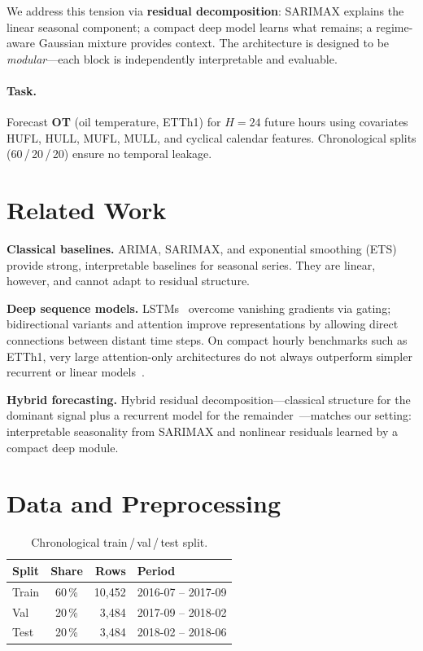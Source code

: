 \documentclass[10pt,a4paper,twocolumn]{article}
\begin{document}
We address this tension via \textbf{residual decomposition}: SARIMAX explains
the linear seasonal component; a compact deep model learns what remains; a
regime-aware Gaussian mixture provides context.
The architecture is designed to be \emph{modular}---each block is independently
interpretable and evaluable.

\paragraph{Task.}
Forecast \textbf{OT} (oil temperature, ETTh1) for $H=24$ future hours using
covariates HUFL, HULL, MUFL, MULL, and cyclical calendar features.
Chronological splits (60\,/\,20\,/\,20) ensure no temporal leakage.

\section{Related Work}

\textbf{Classical baselines.}
ARIMA, SARIMAX, and exponential smoothing (ETS) provide strong, interpretable
baselines for seasonal series.
They are linear, however, and cannot adapt to residual structure.

\textbf{Deep sequence models.}
LSTMs~\citep{hochreiter1997lstm} overcome vanishing gradients via gating;
bidirectional variants and attention improve representations by allowing direct
connections between distant time steps.
On compact hourly benchmarks such as ETTh1, very large attention-only
architectures do not always outperform simpler recurrent or linear
models~\citep{zeng2023ltsproblem}.

\textbf{Hybrid forecasting.}
Hybrid residual decomposition---classical structure for the dominant signal plus
a recurrent model for the remainder~\citep{smyl2020hybrid}---matches our setting:
interpretable seasonality from SARIMAX and nonlinear residuals learned by a
compact deep module.

\section{Data and Preprocessing}

\begin{table}[h]
  \centering
  \caption{Chronological train\,/\,val\,/\,test split.}
  \label{tab:splits}
  \small
  \begin{tabular}{@{} l c r l @{}}
    \toprule
    Split & Share & Rows & Period \\
    \midrule
    Train & 60\,\% & 10{,}452 & 2016-07 -- 2017-09 \\
    Val   & 20\,\% &  3{,}484 & 2017-09 -- 2018-02 \\
    Test  & 20\,\% &  3{,}484 & 2018-02 -- 2018-06 \\
    \bottomrule
  \end{tabular}
\end{table}
\end{document}
